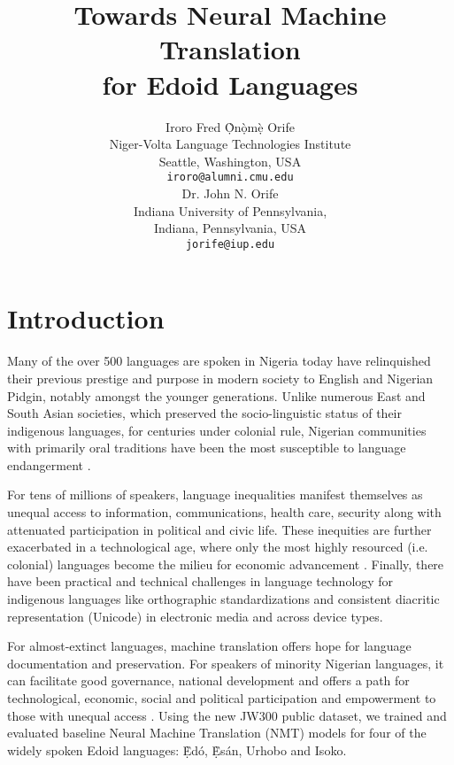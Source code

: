 \documentclass{article} %
\title{Towards Neural Machine Translation \\ for Edoid Languages}
\author{Iroro Fred \d{\`O}n\d{\`o}m\d{\`e} Orife \\
Niger-Volta Language Technologies Institute\\
Seattle, Washington, USA \\
\texttt{iroro@alumni.cmu.edu} \\
\And
Dr. John N. Orife\\
Indiana University of Pennsylvania, \\
Indiana, Pennsylvania, USA \\
\texttt{jorife@iup.edu} \\
}
\begin{document}
\maketitle



\section{Introduction}

Many of the over 500 languages are spoken in Nigeria today have relinquished their previous prestige and purpose in modern society to English and Nigerian Pidgin, notably amongst the younger generations. Unlike numerous East and South Asian societies, which preserved the socio-linguistic status of their indigenous languages, for centuries under colonial rule, Nigerian communities with primarily oral traditions have been the most susceptible to language endangerment \citep{rolle2013phonetics, omo2004esan}.

For tens of millions of speakers, language inequalities manifest themselves as unequal access to information, communications, health care, security along with attenuated participation in political and civic life. These inequities are further exacerbated in a technological age, where only the most highly resourced (i.e. colonial) languages become the milieu for economic advancement \citep{odojelanguage, awobuluyi201626, ganagana2019contrastive}. Finally, there have been practical and technical challenges in language technology for indigenous languages like orthographic standardizations and consistent diacritic representation (Unicode) in electronic media and across device types. 

For almost-extinct languages, machine translation offers hope for language documentation and preservation. For speakers of minority Nigerian languages, it can facilitate good governance, national development and offers a path for technological, economic, social and political participation and empowerment to those with unequal access \citep{odoje201612, odojelanguage}. Using the new JW300 public dataset, we trained and evaluated baseline Neural Machine Translation (NMT) models for four of the widely spoken Edoid languages: \d{\`E}d{\'o}, \d{\`E}s{\'a}n, Urhobo and Isoko. 
\end{document}
